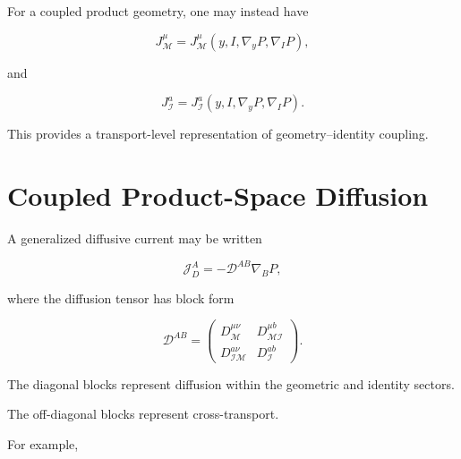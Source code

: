 \documentclass[12pt,oneside]{book}
\begin{document}
For a coupled product geometry, one may instead have

\begin{equation}
    J_{\mathcal{M}}^\mu
    =
    J_{\mathcal{M}}^\mu
    \left(
        y,
        I,
        \nabla_y P,
        \nabla_I P
    \right),
    \label{eq:geometry-current-coupled}
\end{equation}

and

\begin{equation}
    J_{\mathcal{I}}^a
    =
    J_{\mathcal{I}}^a
    \left(
        y,
        I,
        \nabla_y P,
        \nabla_I P
    \right).
    \label{eq:identity-current-coupled}
\end{equation}

This provides a transport-level representation of
geometry--identity coupling.


\section{Coupled Product-Space Diffusion}
\label{sec:coupled-product-diffusion}

A generalized diffusive current may be written

\begin{equation}
    \mathcal{J}^A_D
    =
    -
    \mathcal{D}^{AB}
    \nabla_B P,
    \label{eq:product-diffusive-current}
\end{equation}

where the diffusion tensor has block form

\begin{equation}
    \mathcal{D}^{AB}
    =
    \begin{pmatrix}
        D_{\mathcal{M}}^{\mu\nu}
        &
        D_{\mathcal{MI}}^{\mu b}
        \\
        D_{\mathcal{IM}}^{a\nu}
        &
        D_{\mathcal{I}}^{ab}
    \end{pmatrix}.
    \label{eq:product-diffusion-matrix}
\end{equation}

The diagonal blocks represent diffusion within the geometric and
identity sectors.

The off-diagonal blocks represent cross-transport.

For example,
\end{document}
